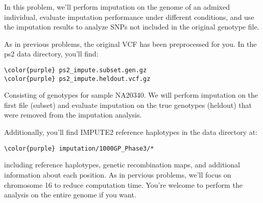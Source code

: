 \documentclass[12pt]{article}
\begin{document}
In this problem, we'll perform imputation on the genome of an admixed individual, evaluate imputation performance under different conditions, and use the imputation results to analyze SNPs not included in the original genotype file.

As in previous problems, the original VCF has been preprocessed for you. In the ps2 data directory, you'll find:

\begin{Verbatim}[commandchars=\\\{\}]
\color{purple} ps2_impute.subset.gen.gz 
\color{purple} ps2_impute.heldout.vcf.gz 
\end{Verbatim}

Consisting of genotypes for sample NA20340. We will perform imputation on the first file (subset) and evaluate imputation on the true genotypes (heldout) that were removed from the imputation analysis.

Additionally, you'll find IMPUTE2 reference haplotypes in the data directory at:
\begin{Verbatim}[commandchars=\\\{\}]
\color{purple} imputation/1000GP_Phase3/*
\end{Verbatim}
including reference haplotypes, genetic recombination maps, and additional information about each position. As in pervious problems, we'll focus on chromosome 16 to reduce computation time. You're welcome to perform the analysis on the entire genome if you want.
\end{document}
